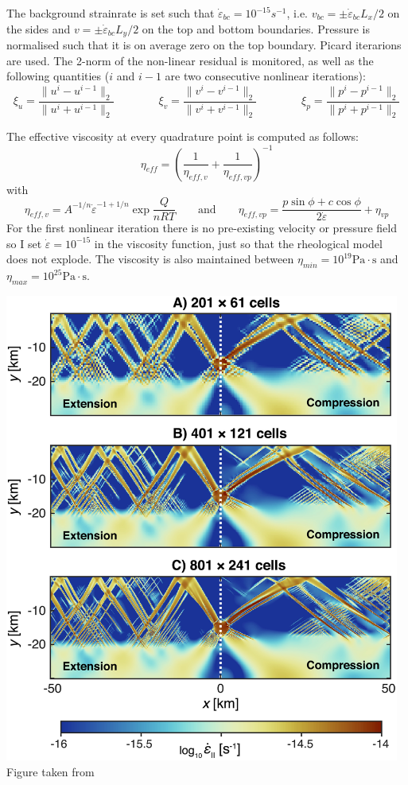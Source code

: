 The background strainrate is set such that $\dot{\varepsilon}_{bc}=10^{-15}s^{-1}$, i.e. 
$v_{bc}=\pm \dot{\varepsilon}_{bc} L_x/2 $ on the sides and $v=\pm \dot{\varepsilon}_{bc} L_y/2 $
on the top and bottom boundaries.
Pressure is normalised such that it is on average zero on the top boundary. 
Picard iterarions are used. The 2-norm of the non-linear residual 
is monitored, as well as the following quantities ($i$ and $i-1$ are two consecutive nonlinear iterations):
\[
\xi_u = \frac{\|u^i-u^{i-1}\|_2}{ \|u^i+u^{i-1}\|_2}
\qquad
\qquad
\xi_v = \frac{\|v^i-v^{i-1}\|_2}{ \|v^i+v^{i-1}\|_2}
\qquad
\qquad
\xi_p = \frac{\|p^i-p^{i-1}\|_2}{ \|p^i+p^{i-1}\|_2}
\] 
 

The effective viscosity at every quadrature point is computed as follows:
\[
\eta_{eff} = \left( \frac{1}{\eta_{eff,v}}  + \frac{1}{\eta_{eff,vp}}  \right)^{-1}
\]
with 
\[
\eta_{eff,v} = A^{-1/n} \dot{\varepsilon}^{-1+1/n} \exp \frac{Q}{nRT}
\qquad
\text{and}
\qquad
\eta_{eff,vp} = \frac{p \sin \phi + c \cos \phi}{2 \dot{\varepsilon}}  + \eta_{vp}
\]
For the first nonlinear iteration there is no pre-existing velocity or pressure field so 
I set $\dot{\varepsilon}=10^{-15}$ in the viscosity function, 
just so that the rheological model does not explode. 
The viscosity is also maintained between $\eta_{min}=10^{19}\text{Pa}\cdot\text{s}$ 
and $\eta_{max}=10^{25}\text{Pa}\cdot\text{s}$.


\begin{center}
\includegraphics[width=13cm]{python_codes/fieldstone_70/images/fig2}\\
{\captionfont Figure taken from \cite{dudy20}}
\end{center}

